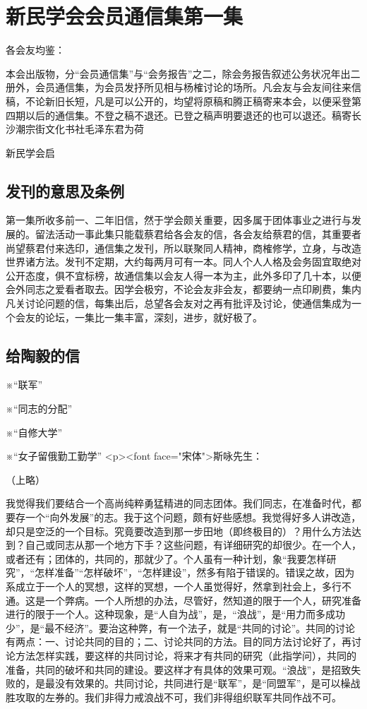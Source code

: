 \section{新民学会会员通信集第一集}



各会友均鉴：

本会出版物，分“会员通信集”与“会务报告”之二，除会务报告叙述公务状况年出二册外，会员通信集，为会员发抒所见相与杨榷讨论的场所。凡会友与会友间往来信稿，不论新旧长短，凡是可以公开的，均望将原稿和腾正稿寄来本会，以便采登第四期以后的通信集。不登之稿不退还。已登之稿声明要退还的也可以退还。稿寄长沙潮宗街文化书社毛泽东君为荷

\begin{flushright}新民学会启\end{flushright}
\subsection{发刊的意思及条例}
第一集所收多前一、二年旧信，然于学会颇关重要，因多属于团体事业之进行与发展的。留法活动一事此集只能载蔡君给各会友的信，各会友给蔡君的信，其重要者尚望蔡君付来选印，通信集之发刊，所以联聚同人精神，商榷修学，立身，与改造世界诸方法。发刊不定期，大约每两月可有一本。同人个人人格及会务固宜取绝对公开态度，俱不宜标榜，故通信集以会友人得一本为主，此外多印了几十本，以便会外同志之爱看者取去。因学会极穷，不论会友非会友，都要纳一点印刷费，集内凡关讨论问题的信，每集出后，总望各会友对之再有批评及讨论，使通信集成为一个会友的论坛，一集比一集丰富，深刻，进步，就好极了。
\subsection{给陶毅的信}
※“联军”

※“同志的分配”

※“自修大学”

※“女子留俄勤工勤学”
<p><font face="宋体">斯咏先生：

（上略）

我觉得我们要结合一个高尚纯粹勇猛精进的同志团体。我们同志，在准备时代，都要存一个“向外发展”的志。我于这个问题，颇有好些感想。我觉得好多人讲改造，却只是空泛的一个目标。究竟要改造到那一步田地（即终极目的）？用什么方法达到？自己或同志从那一个地方下手？这些问题，有详细研究的却很少。在一个人，或者还有；团体的，共同的，那就少了。个人虽有一种计划，象“我要怎样研究”，“怎样准备”“怎样破坏”，“怎样建设”，然多有陷于错误的。错误之故，因为系成立于一个人的冥想，这样的冥想，一个人虽觉得好，然拿到社会上，多行不通。这是一个弊病。一个人所想的办法，尽管好，然知道的限于一个人，研究准备进行的限于一个人。这种现象，是“人自为战”，是，“浪战”，是“用力而多成功少”，是“最不经济”。要治这种弊，有一个法子，就是“共同的讨论”。共同的讨论有两点：一、讨论共同的目的；二、讨论共同的方法。目的同方法讨论好了，再讨论方法怎样实践，要这样的共同讨论，将来才有共同的研究（此指学问），共同的准备，共同的破坏和共同的建设。要这样才有具体的效果可观。“浪战”，是招致失败的，是最没有效果的。共同讨论，共同进行是“联军”，是“同盟军”，是可以橾战胜攻取的左券的。我们非得力戒浪战不可，我们非得组织联军共同作战不可。

